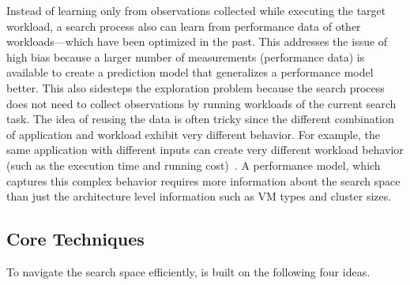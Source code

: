 Instead of learning only from observations collected
while executing the target workload, a search process also can learn from
performance data of other workloads---which have been optimized in the past.
This addresses the issue of high bias because a larger number of
measurements (performance data) is available to create a prediction model that
generalizes a performance model better.
This also sidesteps the exploration problem because the search process
does not need to collect observations by running workloads
of the current search task.
The idea of reusing the data is often tricky
since the different combination of application and workload exhibit
very different behavior.
For example, the same application with different inputs can create
very different workload behavior
(such as the execution time and running cost)~\cite{Hsu2018Arrow}.
A performance model, which captures this complex behavior requires
more information about the search space than just
the architecture level information such as VM types and cluster sizes.


\subsection{Core Techniques}
To navigate the search space efficiently, \scout is built on
the following four ideas.


